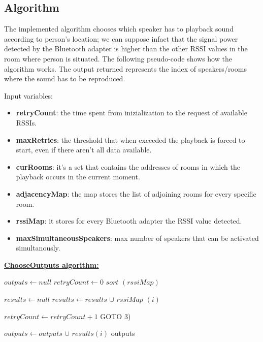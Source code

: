 \documentclass[conference]{IEEEtran}
\begin{document}
\subsection{Algorithm}
The implemented algorithm chooses which speaker has to playback sound according to person's location; we can suppose infact that the signal power detected by the Bluetooth adapter is higher than the other RSSI values in the room where person is situated. The following pseudo-code shows how the algorithm works. The output returned represents the index of speakers/rooms where the sound has to be reproduced.

Input variables:
\begin{itemize}
\item \textbf{retryCount}: the time spent from inizialization to the request of available RSSIs.
\item \textbf{maxRetries}: the threshold that when exceeded the playback is forced to start, even if there aren't all data available.
\item \textbf{curRooms}: it's a set that contains the addresses of rooms in which the playback occurs in the current moment.
\item \textbf{adjacencyMap}: the map stores the list of adjoining rooms for every specific room.
\item \textbf{rssiMap}: it stores for every Bluetooth adapter the RSSI value detected.
\item \textbf{maxSimultaneousSpeakers}: max number of speakers that can be activated simultanously.
\end{itemize}
\textbf{\underline{ChooseOutputs algorithm:}}
\vspace{0.3cm}
\begin{algorithmic}[1]

\STATE $outputs \gets null$ 
\STATE $retryCount \gets 0$
\STATE $sort$ $(rssiMap)$ 

\STATE $results \gets null$
\STATE $results \gets results$ $\cup$ $rssiMap$ $(i)$ 
\ENDFOR

\STATE $ retryCount \gets retryCount + 1 $ 
\STATE GOTO 3)
\ENDIF

		\STATE $outputs \gets outputs$ $\cup$ $results(i)$ 
	\ENDIF
\ENDFOR
\RETURN outputs
\end{algorithmic}
\end{document}
